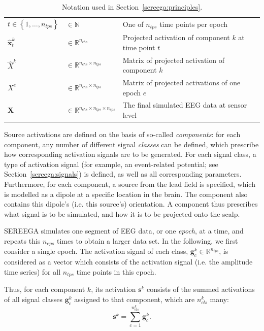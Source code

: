 \begin{table}[ht]
{\begin{tabular}{l l l }
            $t\in \left\{1, \dots, n_{tps}\right\} $&$\in \mathbb{N}$	                & One of $n_{tps}$ time points per epoch \\
            $\bm{\hat{x}}^{k}_{t} $ & $\in \mathbb{R}^{n_{chs}}$                    & Projected activation of component $k$ at  time point $t$\\
            $\hat{X}^k $ & $\in \mathbb{R}^{n_{chs} \times n_{tps}}$                    & Matrix of projected activation of component $k$ \\
            $X^e$ & $\in \mathbb{R}^{n_{chs}\times n_{tps}}$                            & Matrix of projected activations of one epoch $e$ \\
            $\bm{X} $ & $\in \mathbb{R}^{n_{chs}\times n_{tps} \times n_{eps}}$     & The final simulated EEG data at sensor level \\
            \hline
        \end{tabular}}
    \caption{Notation used in Section~\protect\ref{sereega:principles}.}
\end{table}

Source activations are defined on the basis of so-called \emph{components}: for each component, any number of different signal \emph{classes} can be defined, which prescribe how corresponding activation signals are to be generated. For each signal class, a type of activation signal (for example, an event-related potential; see Section~\ref{sereega:signals}) is defined, as well as all corresponding parameters. Furthermore, for each component, a source from the lead field is specified, which is modelled as a dipole at a specific location in the brain. The component also contains this dipole's (i.e. this source's) orientation. A component thus prescribes what signal is to be simulated, and how it is to be projected onto the scalp.

SEREEGA simulates one segment of EEG data, or one \emph{epoch}, at a time, and repeats this $n_{eps}$ times to obtain a larger data set. In the following, we first consider a single epoch. The activation signal of each class, $\bm{g}^{k}_{c} \in \mathbb{R}^{n_{tps}}$, is considered as a vector which consists of the activation signal (i.e. the amplitude time series) for all $n_{tps}$ time points in this epoch. 

Thus, for each component $k$, its activation $\bm{s}^k$ consists of the summed activations of all signal classes $\bm{g}^{k}_{c}$ assigned to that component, which are $n_{cls}^k$ many:
$$\bm{s}^k = \sum_{c=1}^{n_{cls}^k} \bm{g}^{k}_{c}.$$

